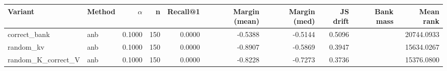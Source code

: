 \begin{tabular}{l l r r r r r r r r}
\toprule
Variant & Method & $\alpha$ & n & Recall@1 & Margin (mean) & Margin (med) & JS drift & Bank mass & Mean rank \\
\midrule
correct\_bank & anb & 0.1000 & 150 & 0.0000 & -0.5388 & -0.5144 & 0.5096 &  & 20744.0933 \\
random\_kv & anb & 0.1000 & 150 & 0.0000 & -0.8907 & -0.5869 & 0.3947 &  & 15634.0267 \\
random\_K\_correct\_V & anb & 0.1000 & 150 & 0.0000 & -0.8228 & -0.7273 & 0.3736 &  & 15376.0800 \\
\bottomrule
\end{tabular}
